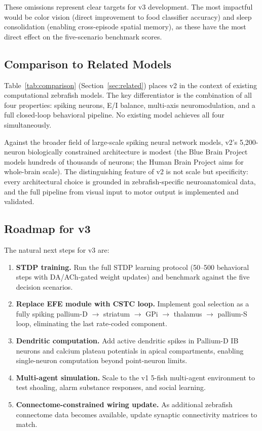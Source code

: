 \documentclass[11pt,a4paper]{article}
\begin{document}
These omissions represent clear targets for v3 development.
The most impactful would be color vision (direct improvement to
food classifier accuracy) and sleep consolidation (enabling
cross-episode spatial memory), as these have the most direct
effect on the five-scenario benchmark scores.

\subsection{Comparison to Related Models}\label{sec:model_comparison}

Table~\ref{tab:comparison} (Section~\ref{sec:related}) places v2 in
the context of existing computational zebrafish models.
The key differentiator is the combination of all four properties:
spiking neurons, E/I balance, multi-axis neuromodulation, and a full
closed-loop behavioral pipeline.
No existing model achieves all four simultaneously.

Against the broader field of large-scale spiking neural network models,
v2's 5,200-neuron biologically constrained architecture is modest
(the Blue Brain Project models hundreds of thousands of neurons;
the Human Brain Project aims for whole-brain scale).
The distinguishing feature of v2 is not scale but specificity:
every architectural choice is grounded in zebrafish-specific
neuroanatomical data, and the full pipeline from visual input to
motor output is implemented and validated.

\subsection{Roadmap for v3}\label{sec:roadmap}

The natural next steps for v3 are:

\begin{enumerate}[nosep,leftmargin=2em]
  \item \textbf{STDP training.}
    Run the full STDP learning protocol (50--500 behavioral steps
    with DA/ACh-gated weight updates) and benchmark against the
    five decision scenarios.
  \item \textbf{Replace EFE module with CSTC loop.}
    Implement goal selection as a fully spiking
    pallium-D $\to$ striatum $\to$ GPi $\to$ thalamus $\to$ pallium-S
    loop, eliminating the last rate-coded component.
  \item \textbf{Dendritic computation.}
    Add active dendritic spikes in Pallium-D IB neurons
    and calcium plateau potentials in apical compartments,
    enabling single-neuron computation beyond point-neuron limits.
  \item \textbf{Multi-agent simulation.}
    Scale to the v1 5-fish multi-agent environment to test shoaling,
    alarm substance responses, and social learning.
  \item \textbf{Connectome-constrained wiring update.}
    As additional zebrafish connectome data becomes available,
    update synaptic connectivity matrices to match.
\end{enumerate}
\end{document}
